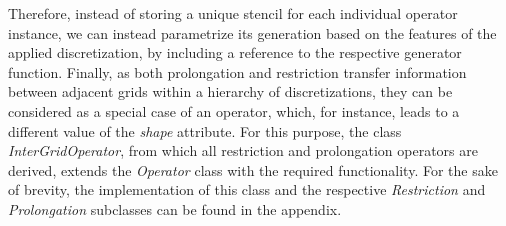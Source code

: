 Therefore, instead of storing a unique stencil for each individual operator instance, we can instead parametrize its generation based on the features of the applied discretization, by including a reference to the respective generator function.
Finally, as both prolongation and restriction transfer information between adjacent grids within a hierarchy of discretizations, they can be considered as a special case of an operator, which, for instance, leads to a different value of the \emph{shape} attribute.
For this purpose, the class \emph{InterGridOperator}, from which all restriction and prolongation operators are derived, extends the \emph{Operator} class with the required functionality.
For the sake of brevity, the implementation of this class and the respective \emph{Restriction} and \emph{Prolongation} subclasses can be found in the appendix.

